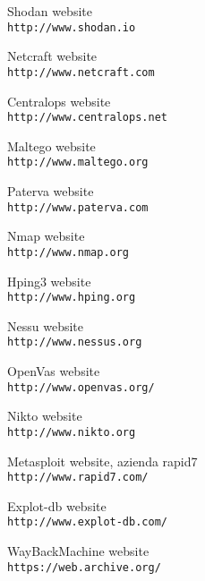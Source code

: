 \documentclass[a4paper,12pt]{article}
\begin{document}
\begin{thebibliography}{15}
Shodan website
\\\texttt{http://www.shodan.io}

Netcraft website
\\\texttt{http://www.netcraft.com}

Centralops website
\\\texttt{http://www.centralops.net}

Maltego website
\\\texttt{http://www.maltego.org}

Paterva website
\\\texttt{http://www.paterva.com}

Nmap website
\\\texttt{http://www.nmap.org}

Hping3 website
\\\texttt{http://www.hping.org}

Nessu website
\\\texttt{http://www.nessus.org}

OpenVas website
\\\texttt{http://www.openvas.org/}

Nikto website
\\\texttt{http://www.nikto.org}

Metasploit website, azienda rapid7
\\\texttt{http://www.rapid7.com/}

Explot-db website
\\\texttt{http://www.explot-db.com/}

WayBackMachine website
\\\texttt{https://web.archive.org/}

\end{thebibliography}
\end{document}

